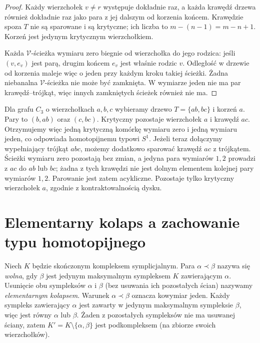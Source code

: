 \begin{proof}
Każdy wierzchołek $v\ne r$ występuje dokładnie raz,
a każda krawędź drzewa również dokładnie raz jako
para z jej dalszym od korzenia końcem. Krawędzie
spoza $T$ nie są sparowane i są krytyczne; ich liczba
to $m-(n-1)=m-n+1$. Korzeń jest jedynym krytycznym
wierzchołkiem.

Każda $\mathcal V$-ścieżka wymiaru zero biegnie
od wierzchołka do jego rodzica: jeśli
$(v,e_v)$ jest parą, drugim końcem $e_v$ jest
właśnie rodzic $v$. Odległość w drzewie od korzenia
maleje więc o jeden przy każdym kroku takiej ścieżki.
Żadna niebanalna $\mathcal V$-ścieżka nie może być
zamknięta. W wymiarze jeden nie ma par krawędź--trójkąt,
więc innych zamkniętych ścieżek również nie ma.
\end{proof}

\begin{przyklad}
Dla grafu $C_3$ o wierzchołkach $a,b,c$ wybieramy
drzewo $T=\{ab,bc\}$ i korzeń $a$.
Pary to $(b,ab)$ oraz $(c,bc)$. Krytyczny pozostaje
wierzchołek $a$ i krawędź $ac$. Otrzymujemy więc
jedną krytyczną komórkę wymiaru zero i jedną
wymiaru jeden, co odpowiada homotopijnemu typowi $S^1$.
Jeżeli teraz dołączymy wypełniający trójkąt $abc$,
możemy dodatkowo sparować krawędź $ac$ z trójkątem.
Ścieżki wymiaru zero pozostają bez zmian, a jedyna
para wymiarów $1,2$ prowadzi z $ac$ do $ab$ lub $bc$;
żadna z tych krawędzi nie jest dolnym elementem
kolejnej pary wymiarów $1,2$. Parowanie jest zatem
acykliczne. Pozostaje tylko krytyczny wierzchołek $a$,
zgodnie z kontraktowalnością dysku.
\end{przyklad}

\section{Elementarny kolaps a zachowanie typu homotopijnego}
\label{sec:tg-forman-collapse}

\begin{definicja}
Niech $K$ będzie skończonym kompleksem symplicjalnym.
Para $\alpha\prec\beta$ nazywa się \emph{wolna},
gdy $\beta$ jest jedynym maksymalnym sympleksem $K$
zawierającym $\alpha$. Usunięcie obu sympleksów
$\alpha$ i $\beta$ (bez usuwania ich pozostałych
ścian) nazywamy \emph{elementarnym kolapsem}.
Warunek $\alpha\prec\beta$ oznacza kowymiar jeden.
Każdy sympleks zawierający $\alpha$ jest zawarty
w jedynym maksymalnym sympleksie $\beta$, więc jest
równy $\alpha$ lub $\beta$. Żaden z pozostałych
sympleksów nie ma usuwanej ściany, zatem
$K'=K\setminus\{\alpha,\beta\}$ jest podkompleksem
(na zbiorze swoich wierzchołków).
\end{definicja}

